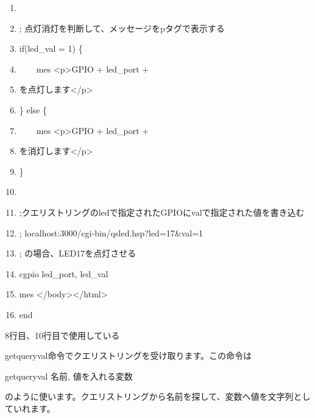 \documentclass[a4paper,12pt,dvipdfmx]{jarticle}
\begin{document}
\begin{boxedminipage}{16.538cm}
\begin{enumerate}
	\item

	\item; 点灯消灯を判断して、メッセージをpタグで表示する

	\item if(led\_val = 1) \{

	\item\ \ \ \ mes {\textquotedbl}{\textless}p{\textgreater}GPIO{\textquotedbl} + led\_port +
	\item{\textquotedbl}を点灯します{\textless}/p{\textgreater}{\textquotedbl}

	\item\} else \{

	\item\ \ \ \ mes {\textquotedbl}{\textless}p{\textgreater}GPIO{\textquotedbl} + led\_port +
	\item{\textquotedbl}を消灯します{\textless}/p{\textgreater}{\textquotedbl}

	\item\}


	\item

	\item;クエリストリングのledで指定されたGPIOにvalで指定された値を書き込む

	\item; localhost:3000/cgi-bin/qsled.hsp?led=17\&val=1

	\item; の場合、LED17を点灯させる

	\item cgpio led\_port, led\_val

	\item mes {\textquotedbl}{\textless}/body{\textgreater}{\textless}/html{\textgreater}{\textquotedbl}

	\item end
	\end{enumerate}
\end{boxedminipage}
\flushleft

\bigskip



\bigskip


\bigskip

8行目、10行目で使用している

getqueryval命令でクエリストリングを受け取ります。この命令は

getqueryval 名前, 値を入れる変数

のように使います。クエリストリングから名前を探して、変数へ値を文字列としていれます。
\end{document}
